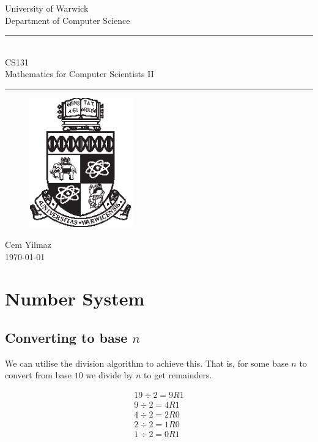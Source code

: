 \documentclass[a4paper]{article}
\theoremstyle{plain}
\theoremstyle{definition}
\newtheorem{exmp}{Example}[section]
\theoremstyle{remark}
\begin{document}
	\begin{titlepage}
	\begin{center}
	\large
	University of Warwick \\
	Department of Computer Science \\
	\huge
	\vspace{50mm}
	\rule{\linewidth}{0.5pt} \\
	CS131 \\
	\vspace{5mm}
	\Large
	Mathematics for Computer Scientists II
	\rule{\linewidth}{0.5pt}
	\vspace{5mm}
	\begin{figure}[H]
	\centering
	\includegraphics[width=0.4\textwidth]{crest_black.eps}
	\end{figure}
	\vspace{37mm}
	Cem Yilmaz \\
	\today
	\end{center}
	\end{titlepage}
	\newpage
	\tableofcontents
	\newpage
\section{Number System}
\subsection{Converting to base $n$}
We can utilise the division algorithm to achieve this. That is, for some base $n$ to convert from  base $10$ we divide by $n$ to get remainders.
\begin{tcolorbox}[colback=black!3!white,colframe=black!60!white,title=\begin{exmp}Division of binary \label{Division of binary}\end{exmp}]
        
                \begin{align}
                19 \div 2 = 9 R 1 \\
		9 \div 2 = 4 R 1 \\
		4 \div 2 = 2 R 0 \\
		2 \div 2 = 1 R 0 \\
		1 \div 2 = 0 R 1 
                \end{align}
\end{tcolorbox}
\end{document}
